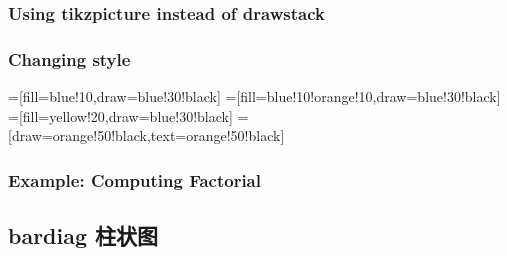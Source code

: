 \begin{drawstack}
   
\end{drawstack}

\subsubsection{Using tikzpicture instead of drawstack}

%
%


\subsubsection{Changing style}

{%
=[fill=blue!10,draw=blue!30!black]
=[fill=blue!10!orange!10,draw=blue!30!black]
=[fill=yellow!20,draw=blue!30!black]
=[draw=orange!50!black,text=orange!50!black]

\begin{drawstack}
   
\end{drawstack}
}

\subsubsection{Example: Computing Factorial}

\begin{drawstack}[scale=0.8]
  \startframe
  \startframe
  \cell{$\vdots$}
  \startframe
\end{drawstack}

\subsection{bardiag 柱状图}
